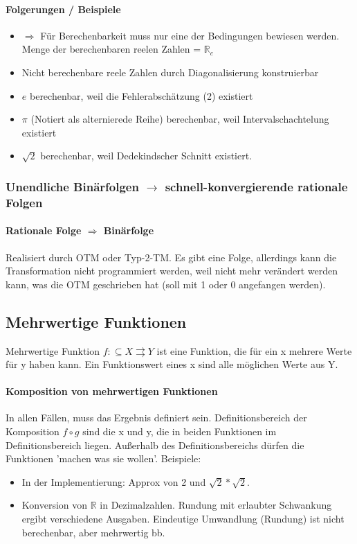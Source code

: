 \documentclass[ngerman]{scrartcl}
\begin{document}
 \paragraph{Folgerungen / Beispiele}
\begin{itemize}
  \item $ \Rightarrow $ Für Berechenbarkeit muss nur eine der Bedingungen bewiesen werden. Menge der berechenbaren reelen Zahlen = $ \mathbb{R}_c $
  \item Nicht berechenbare reele Zahlen durch Diagonalisierung konstruierbar
  \item $ e $ berechenbar, weil die Fehlerabschätzung (2) existiert
  \item $ \pi $ (Notiert als alternierede Reihe) berechenbar, weil Intervalschachtelung existiert
  \item $ \sqrt{2} $ berechenbar, weil Dedekindscher Schnitt existiert.
 \end{itemize}

\subsubsection{Unendliche Binärfolgen $ \rightarrow $ schnell-konvergierende rationale Folgen}
\paragraph{Rationale Folge $ \Rightarrow $ Binärfolge}
Realisiert durch OTM oder Typ-2-TM. Es gibt eine Folge, allerdings kann die Transformation nicht programmiert werden, weil nicht mehr verändert werden kann, was die OTM geschrieben hat (soll mit 1 oder 0 angefangen werden).

\subsection{Mehrwertige Funktionen}
Mehrwertige Funktion $ f: \subseteq X \rightrightarrows  Y $ ist eine Funktion, die für ein x mehrere Werte für y haben kann. Ein Funktionswert eines x sind alle möglichen Werte aus Y.

\paragraph{Komposition von mehrwertigen Funktionen} In allen Fällen, muss das Ergebnis definiert sein. Definitionsbereich  der Komposition $ f \circ g $ sind die x und y, die in beiden Funktionen im Definitionsbereich liegen. Außerhalb des Definitionsbereichs dürfen die Funktionen 'machen was sie wollen'. Beispiele:
\begin{itemize}
  \item In der Implementierung: Approx von 2 und $ \sqrt{2} * \sqrt{2} $.
  \item Konversion von $ \mathbb{R} $ in Dezimalzahlen. Rundung mit erlaubter Schwankung ergibt verschiedene Ausgaben. Eindeutige Umwandlung (Rundung) ist nicht berechenbar, aber mehrwertig bb.
\end{itemize}
\end{document}
